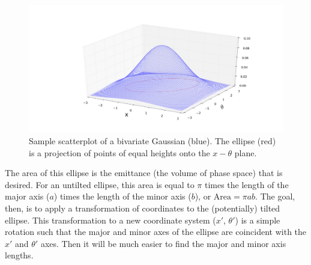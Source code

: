 \begin{figure}
  \centering
    \includegraphics[width=\textwidth]{Figures/bivariate_ellipse} 
  \caption[Sample scatterplot of a bivariate Gaussian with its projected ellipse.]{Sample scatterplot of a bivariate Gaussian (blue). The ellipse (red) is a projection of points of equal heights onto the $x-\theta$ plane.}
  \label{fig:bivariate_ellipse}
\end{figure}

The area of this ellipse is the emittance (the volume of phase space) that is desired. For an untilted ellipse, this area is equal to $\pi$ times the length of the major axis ($a$) times the length of the minor axis ($b$), or $\text{Area}=\pi a b$. The goal, then, is to apply a transformation of coordinates to the (potentially) tilted ellipse. This transformation to a new coordinate system ($x'$, $\theta '$) is a simple rotation such that the major and minor axes of the ellipse are coincident with the $x'$ and $\theta '$ axes. Then it will be much easier to find the major and minor axis lengths.

